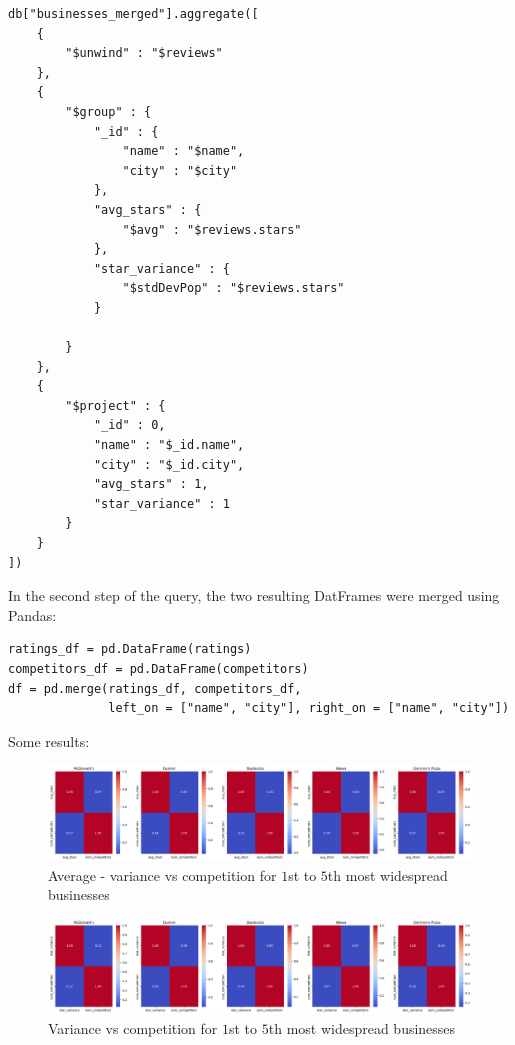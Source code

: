 \documentclass{Configuration_Files/PoliMi3i_thesis}
\begin{document}
\begin{itemize}
\bigskip

\begin{lstlisting}[style=mongodb]
db["businesses_merged"].aggregate([
    {
        "$unwind" : "$reviews" 
    },
    {
        "$group" : {
            "_id" : {
                "name" : "$name", 
                "city" : "$city" 
            },
            "avg_stars" : {
                "$avg" : "$reviews.stars" 
            },
            "star_variance" : {
                "$stdDevPop" : "$reviews.stars"
            }

        }
    },
    {
        "$project" : {
            "_id" : 0,
            "name" : "$_id.name",
            "city" : "$_id.city",
            "avg_stars" : 1,
            "star_variance" : 1
        }
    }
])

\end{lstlisting}

\bigskip

\end{itemize}

In the second step of the query, the two resulting DatFrames were merged using Pandas:
\bigskip 

\begin{verbatim}
ratings_df = pd.DataFrame(ratings)
competitors_df = pd.DataFrame(competitors)
df = pd.merge(ratings_df, competitors_df, 
              left_on = ["name", "city"], right_on = ["name", "city"])
\end{verbatim}

\bigskip

Some results:
\bigskip

\begin{figure}[H]
    \centering
    \includegraphics[width=\columnwidth]{imgs/query_4b.png}
    \caption{Average - variance vs competition for $1$st to $5$th most widespread businesses}
    \label{fig:query_4b}
\end{figure}

\bigskip

\begin{figure}[H]
    \centering
    \includegraphics[width=\columnwidth]{imgs/query_4e.png}
    \caption{Variance vs competition for $1$st to $5$th most widespread businesses}
    \label{fig:query_4e}
\end{figure}
\end{document}
